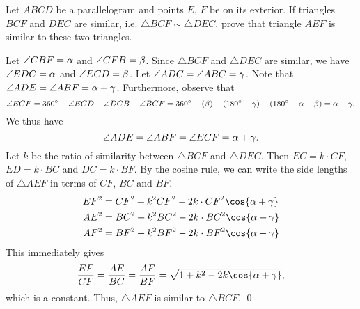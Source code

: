\begin{question}\label{Q::2024-J-2-2}
    Let $ABCD$ be a parallelogram and points $E$, $F$ be on its exterior. If triangles $BCF$ and $DEC$ are similar, i.e. $\triangle BCF \sim \triangle DEC$, prove that triangle $AEF$ is similar to these two triangles.
\end{question}
\begin{center}
\end{center}
\begin{solution*}
    Let $\angle CBF = \alpha$ and $\angle CFB = \beta$. Since $\triangle BCF$ and $\triangle DEC$ are similar, we have $\angle EDC = \alpha$ and $\angle ECD = \beta$. Let $\angle ADC = \angle ABC = \gamma$. Note that $\angle ADE = \angle ABF = \alpha + \gamma$. Furthermore, observe that \[\angle ECF = 360^{\circ} - \angle ECD - \angle DCB - \angle BCF = 360^{\circ} - (\beta) - (180^{\circ} - \gamma) - (180^{\circ} - \alpha - \beta) = \alpha + \gamma.\] We thus have \[\angle ADE = \angle ABF = \angle ECF = \alpha + \gamma.\] Let $k$ be the ratio of similarity between $\triangle BCF$ and $\triangle DEC$. Then $EC = k\cdot CF$, $ED = k \cdot BC$ and $DC = k \cdot BF$. By the cosine rule, we can write the side lengths of $\triangle AEF$ in terms of $CF$, $BC$ and $BF$.
    \begin{align*}
        EF^2 &= CF^2 + k^2 CF^2 - 2k\cdot CF^2 \cos{\a + \g}\\
        AE^2 &= BC^2 + k^2 BC^2 - 2k\cdot BC^2 \cos{\a + \g}\\
        AF^2 &= BF^2 + k^2 BF^2 - 2k\cdot BF^2 \cos{\a + \g}
    \end{align*}
    This immediately gives \[\frac{EF}{CF} = \frac{AE}{BC} = \frac{AF}{BF} = \sqrt{1 + k^2 - 2k \cos{\a + \g}},\]  which is a constant. Thus, $\triangle AEF$ is similar to $\triangle BCF$. \qed
\end{solution*}

